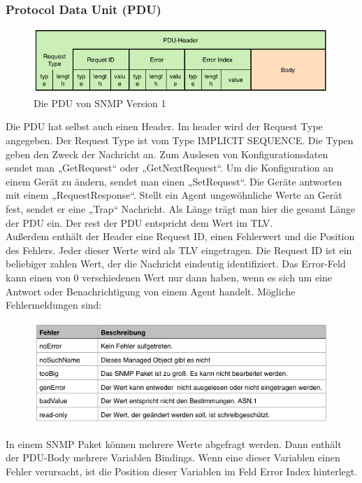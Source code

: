 \documentclass[11pt,a4paper]{article}
\begin{document}
\subsubsection{Protocol Data Unit (PDU)}
\begin{figure}[h]
	\centering
	\includegraphics[scale=1]{Bilder/SNMPv1-PDU}
	\caption{Die PDU von SNMP Version 1}
\end{figure}
Die PDU hat selbst auch einen Header. Im header wird der Request Type angegeben. Der Request Type ist vom Type IMPLICIT SEQUENCE. Die Typen geben den Zweck der Nachricht an. Zum Auslesen von Konfigurationsdaten sendet man „GetRequest“ oder „GetNextRequest“. Um die Konfiguration an einem Gerät zu ändern, sendet man einen „SetRequest“. Die Geräte antworten mit einem „RequestResponse“. Stellt ein Agent ungewöhnliche Werte an Gerät fest, sendet er eine „Trap“ Nachricht. Als Länge trägt man hier die gesamt Länge der PDU ein. Der rest der PDU entspricht dem Wert im TLV.\\
Außerdem enthält der Header eine Request ID, einen Fehlerwert und die Position des Fehlers. Jeder dieser Werte wird als TLV eingetragen.
Die Request ID ist ein beliebiger zahlen Wert, der die Nachricht eindeutig identifiziert.
Das Error-Feld kann einen von 0 verschiedenen Wert nur dann haben, wenn es sich um eine Antwort oder Benachrichtigung von einem Agent handelt. Mögliche Fehlermeldungen sind:\\
\begin{figure}[h]
	\centering
	\includegraphics[scale=1]{Bilder/SNMPv1-Fehler}
\end{figure}
In einem SNMP Paket können mehrere Werte abgefragt werden. Dann enthält der PDU-Body mehrere Variablen Bindings. Wenn eine dieser Variablen einen Fehler verursacht, ist die Position dieser Variablen im Feld Error Index hinterlegt.\\
\end{document}
